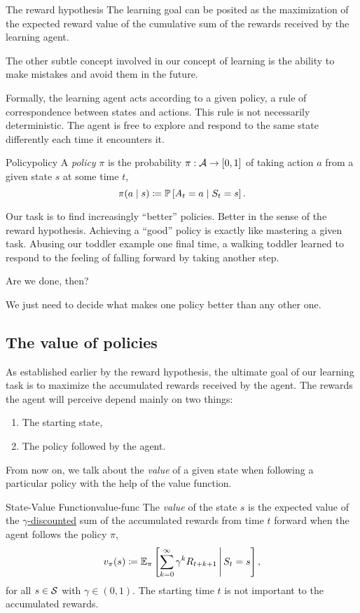 \begin{remark}{The reward hypothesis}
	The learning goal can be posited as the maximization of the expected reward
	value of the cumulative sum of the rewards received by the learning agent. 
\end{remark}

The other subtle concept involved in our concept of learning is the
ability to make mistakes and avoid them in the future.

Formally, the learning agent acts according to a given policy, a rule of
correspondence between states and actions. This rule is not necessarily
deterministic. The agent is free to explore and respond to the same state
differently each time it encounters it.

\begin{dfn}{Policy}{policy}
	A \emph{policy} $\pi$ is the probability $\pi: \mathcal{A} \to [0,1]$ of taking
	action $a$ from a given state $s$ at some time $t$,
	\[
		\pi(a \mid s) \coloneqq \mathbb{P}\left[A_t = a \mid S_t = s\right].
	\]
\end{dfn}

Our task is to find increasingly ``better'' policies. Better in the sense of the
reward hypothesis. Achieving a ``good'' policy is exactly like mastering a given
task. Abusing our toddler example one final time, a walking toddler learned to
respond to the feeling of falling forward by taking another step.

Are we done, then? 

We just need to decide what makes one policy better than any other one.

\subsection{The value of policies}

As established earlier by the reward hypothesis, the ultimate goal of our
learning task is to maximize the accumulated rewards received by the agent. The
rewards the agent will perceive depend mainly on two things:
\begin{enumerate}
	\item The starting state,
	\item The policy followed by the agent.
\end{enumerate}

From now on, we talk about the \textit{value} of a given state when following a
particular policy with the help of the value function.

\begin{dfn}{State-Value Function}{value-func}
	The \emph{value} of the state $s$ is the expected value of the
	\underline{$\gamma$-discounted} sum of the accumulated rewards from time $t$ forward
	when the agent follows the policy $\pi$,
	\[
		v_{\pi} (s) \coloneqq \mathbb{E}_{\pi} \left[\sum_{k=0}^{\infty} \gamma^{k} R_{t+k+1} \,\middle\vert\, S_{t} = s\right],
	\]
	for all $s \in \mathcal{S}$ with $\gamma \in (0, 1)$. The starting time
	$t$ is not important to the accumulated rewards.
\end{dfn}

